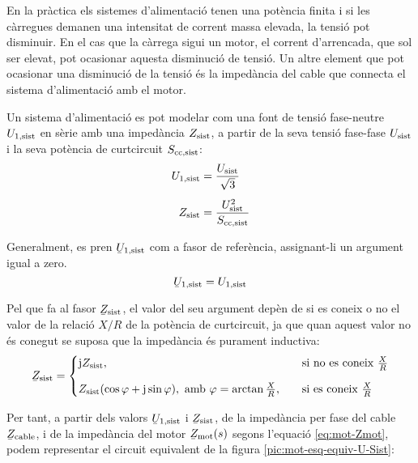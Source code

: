 En la pràctica els sistemes d'alimentació tenen una potència finita i si les càrregues demanen una intensitat de corrent massa elevada, la tensió pot disminuir. En el cas que la càrrega sigui un motor, el corrent d'arrencada, que sol ser elevat, pot ocasionar aquesta disminució de tensió. Un altre element que pot ocasionar una disminució de la tensió és la impedància del cable que connecta el sistema d'alimentació amb el motor.

Un sistema d'alimentació es pot modelar com una font de tensió fase-neutre $U_\mathrm{1,sist}$ en sèrie amb una impedància $Z_\mathrm{sist}$, a partir de la seva tensió fase-fase $U_\mathrm{sist}$ i la seva potència de curtcircuit $S_\mathrm{cc,sist}$:
\begin{align}
	U_\mathrm{1,sist} &= \frac{U_\mathrm{sist}}{\sqrt{3}} \\[1ex]
	Z_\mathrm{sist} &= \frac{U_\mathrm{sist}^2}{S_\mathrm{cc,sist}}
\end{align}

Generalment, es pren $\cmplx{U}\ped{1,sist}$ com a fasor de referència, assignant-li un argument igual a zero. 
\begin{equation}
	\cmplx{U}\ped{1,sist} = U\ped{1,sist}
\end{equation}

Pel que fa al fasor  $\cmplx{Z}\ped{sist}$, el valor del seu argument depèn de si es coneix o no el valor de la relació $X/R$ de la potència de curtcircuit, ja que quan aquest valor no és conegut se suposa que la impedància és purament inductiva:
\begin{equation}
	\cmplx{Z}\ped{sist} = 
	\begin{cases}
		\ju Z\ped{sist},  & \quad\text{si no es coneix }\frac{X}{R}  \\[2ex]
		Z\ped{sist} (\cos\varphi+\ju\sin\varphi), \text{ amb } \varphi=\arctan\frac{X}{R}, & \quad\text{si es coneix } \frac{X}{R} 
	\end{cases}
\end{equation}

Per tant, a partir dels valors $\cmplx{U}\ped{1,sist}$ i $\cmplx{Z}\ped{sist}$, de la impedància per fase del cable $\cmplx{Z}\ped{cable}$, i de la impedància del motor $\cmplx{Z}\ped{mot}(s)$ segons l'equació \eqref{eq:mot-Zmot}, podem representar el circuit equivalent de la figura \vref{pic:mot-esq-equiv-U-Sist}:
\begin{center}
	
	\label{pic:mot-esq-equiv-U-Sist}
\end{center}

